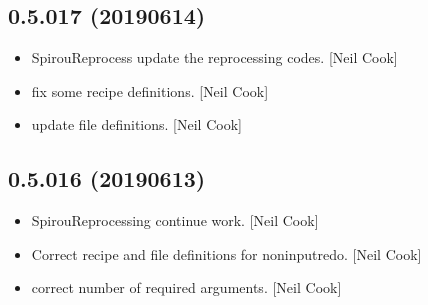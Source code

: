 \documentclass[a4paper,10pt,english]{report}
\begin{document}
\subsection{0.5.017 (2019\sphinxhyphen{}06\sphinxhyphen{}14)}
\label{\detokenize{misc/changelog:id138}}\begin{itemize}
\item {} 
SpirouReprocess \sphinxhyphen{} update the reprocessing codes. {[}Neil Cook{]}

\item {} 
 \sphinxhyphen{} fix some recipe definitions. {[}Neil Cook{]}

\item {} 
 \sphinxhyphen{} update file definitions. {[}Neil Cook{]}

\end{itemize}


\subsection{0.5.016 (2019\sphinxhyphen{}06\sphinxhyphen{}13)}
\label{\detokenize{misc/changelog:id139}}\begin{itemize}
\item {} 
SpirouReprocessing \sphinxhyphen{} continue work. {[}Neil Cook{]}

\item {} 
Correct recipe and file definitions for non\sphinxhyphen{}input\sphinxhyphen{}redo. {[}Neil Cook{]}

\item {} 
 \sphinxhyphen{} correct number of required arguments. {[}Neil
Cook{]}

\end{itemize}
\end{document}
